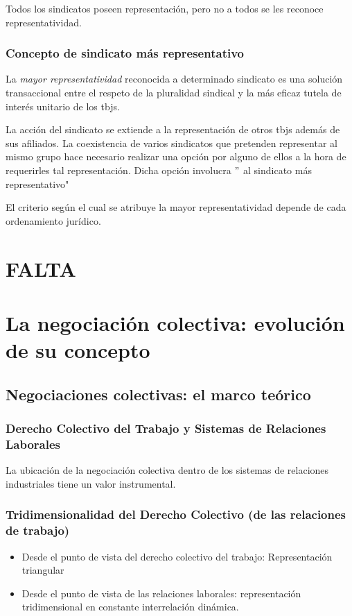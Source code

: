 \documentclass[spanish,12pt,a4paper,titlepage]{report}
\begin{document}
Todos los sindicatos poseen representación, pero no a todos se les reconoce representatividad. 

\subsection{Concepto de sindicato más representativo}

La \textit{mayor representatividad} reconocida a determinado sindicato es una solución transaccional entre el respeto de la pluralidad sindical y la más eficaz tutela de interés unitario de los tbjs.

La acción del sindicato se extiende a la representación de otros tbjs además de sus afiliados. La coexistencia de varios sindicatos que pretenden representar al mismo grupo hace necesario realizar una opción por alguno de ellos a la hora de requerirles tal representación. Dicha opción involucra $"$ al sindicato más representativo"

El criterio según el cual se atribuye la mayor representatividad depende de cada ordenamiento jurídico.

\chapter{FALTA}

\chapter{La negociación colectiva: evolución de su concepto}
\label{chap:18}

\section{Negociaciones colectivas: el marco teórico}
\subsection{Derecho Colectivo del Trabajo y Sistemas de Relaciones Laborales}
La ubicación de la negociación colectiva dentro de los sistemas de relaciones industriales tiene un valor instrumental.

\subsection{Tridimensionalidad del Derecho Colectivo (de las relaciones de trabajo)}
\begin{itemize}
	\item Desde el punto de vista del derecho colectivo del trabajo: Representación triangular
	\item Desde el punto de vista de las relaciones laborales: representación tridimensional en constante interrelación dinámica.
\end{itemize}
\end{document}
